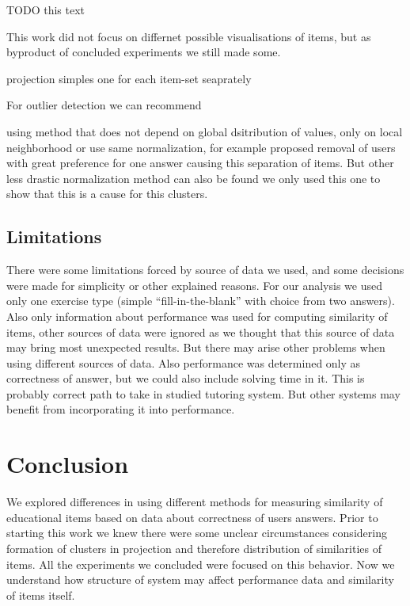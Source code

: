 \documentclass[
  digital, %
  table,   %
  nolof,     %
  nolot,     %
  nocover,
  color
]{fithesis3}
\begin{document}
TODO this text


This work did not focus on differnet possible visualisations of items, but as byproduct of concluded experiments we still made some.

projection
simples one
for each item-set seaprately



For outlier detection we can recommend

using method that does not depend on global dsitribution of values, only on local neighborhood
or
use same normalization, for example proposed removal of users with great preference for one answer causing this separation of items. But other less drastic normalization method can also be found we only used this one to show that this is a cause for this clusters.


\section{Limitations}\label{limitations}

There were some limitations forced by source of data we used, and some decisions were made for simplicity or other explained reasons. For our analysis we used only one exercise type (simple ``fill-in-the-blank'' with choice from two answers). Also only information about performance was used for computing similarity of items, other sources of data were ignored as we thought that this source of data may bring most unexpected results. But there may arise other problems when using different sources of data. Also performance was determined only as correctness of answer, but we could also include solving time in it. This is probably correct path to take in studied tutoring system. But other systems may benefit from incorporating it into performance.

\chapter{Conclusion}



We explored differences in using different methods for measuring similarity of educational items based on data about correctness of users answers. Prior to starting this work we knew there were some unclear circumstances considering formation of clusters in projection and therefore distribution of similarities of items. All the experiments we concluded were focused on this behavior. Now we understand how structure of system may affect performance data and similarity of items itself.
\end{document}
